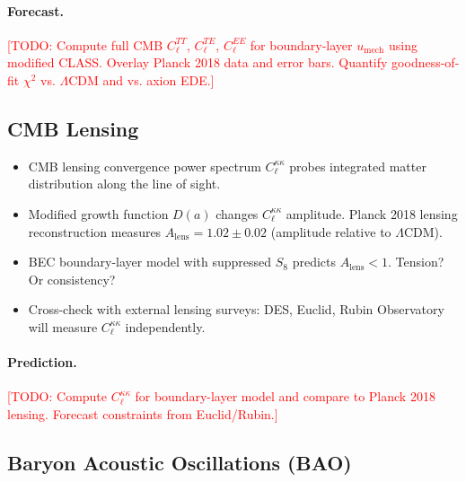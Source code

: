 \documentclass[11pt,a4paper]{article}
\newcommand{\umech}{\ensuremath{u_{\mathrm{mech}}}}
\theoremstyle{definition}
\theoremstyle{remark}
\begin{document}
\paragraph{Forecast.}
\textcolor{red}{[TODO: Compute full CMB $C_\ell^{TT}$, $C_\ell^{TE}$, $C_\ell^{EE}$ for boundary-layer $\umech$ using modified CLASS. Overlay Planck 2018 data and error bars. Quantify goodness-of-fit $\chi^2$ vs. $\Lambda$CDM and vs. axion EDE.]}

\subsection{CMB Lensing}
\label{sec:cmb_lensing}

\begin{itemize}[leftmargin=*, itemsep=0.3em]
\item CMB lensing convergence power spectrum $C_\ell^{\kappa\kappa}$ probes integrated matter distribution along the line of sight.
\item Modified growth function $D(a)$ changes $C_\ell^{\kappa\kappa}$ amplitude. Planck 2018 lensing reconstruction measures $A_{\mathrm{lens}} = 1.02 \pm 0.02$ (amplitude relative to $\Lambda$CDM).
\item BEC boundary-layer model with suppressed $S_8$ predicts $A_{\mathrm{lens}} < 1$. Tension? Or consistency?
\item Cross-check with external lensing surveys: DES, Euclid, Rubin Observatory will measure $C_\ell^{\kappa\kappa}$ independently.
\end{itemize}

\paragraph{Prediction.}
\textcolor{red}{[TODO: Compute $C_\ell^{\kappa\kappa}$ for boundary-layer model and compare to Planck 2018 lensing. Forecast constraints from Euclid/Rubin.]}

\subsection{Baryon Acoustic Oscillations (BAO)}
\label{sec:bao}
\end{document}
